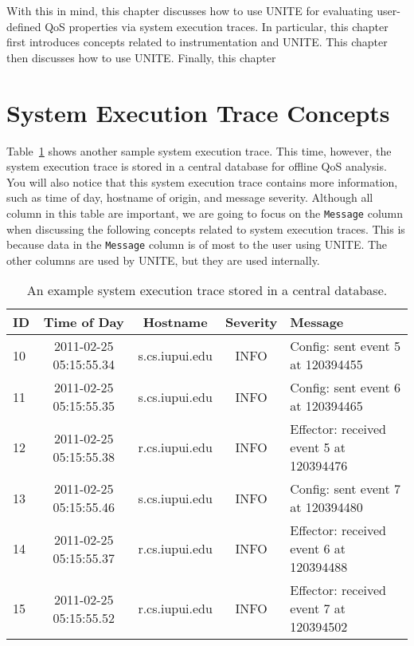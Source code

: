 With this in mind, this chapter discusses how to use UNITE
for evaluating user-defined QoS properties via system execution
traces. In particular, this chapter first introduces concepts
related to instrumentation and UNITE. This chapter then 
discusses how to use UNITE. Finally, this chapter

\section{System Execution Trace Concepts}
\label{sec:unite-concepts}

Table~\ref{table:execution-trace} shows another sample system 
execution trace. This time, however, the system execution 
trace is stored in a central database for offline QoS analysis.
You will also notice that this system execution trace contains
more information, such as time of day, hostname of origin, and
message severity. Although all column in this table are important, 
we are going to focus on the \texttt{Message} column when discussing 
the following concepts related to system execution traces. This
is because data in the \texttt{Message} column is of most to the
user using UNITE. The other columns are used by UNITE, but they
are used internally. 
\begin{table}[h]
  \begin{tabular}{lcccl}
  \hline
  \textbf{ID} & \textbf{Time of Day} & \textbf{Hostname} & \textbf{Severity} & \textbf{Message} \\
  \hline
  10 & 2011-02-25 05:15:55.34 & s.cs.iupui.edu & INFO & Config: sent event 5 at 120394455 \\
  11 & 2011-02-25 05:15:55.35 & s.cs.iupui.edu & INFO & Config: sent event 6 at 120394465 \\
  12 & 2011-02-25 05:15:55.38 & r.cs.iupui.edu & INFO & Effector: received event 5 at 120394476 \\
  13 & 2011-02-25 05:15:55.46 & s.cs.iupui.edu & INFO & Config: sent event 7 at 120394480 \\
  14 & 2011-02-25 05:15:55.37 & r.cs.iupui.edu & INFO & Effector: received event 6 at 120394488 \\
  15 & 2011-02-25 05:15:55.52 & r.cs.iupui.edu & INFO & Effector: received event 7 at 120394502 \\
  \end{tabular}

  \caption{An example system execution trace stored in a central database.}
  \label{table:execution-trace}
\end{table}

